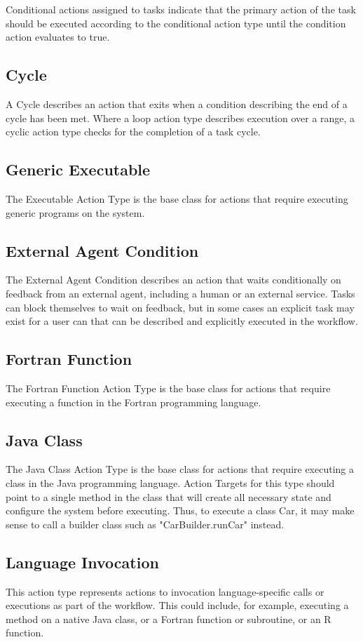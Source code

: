 Conditional actions assigned to tasks indicate that the primary action of the task should be executed according to the conditional action type until the condition action evaluates to true.
			\subsection{
			Cycle
			}
			A Cycle describes an action that exits when a condition describing the end of a cycle has been met. Where a loop action type describes execution over a range, a cyclic action type checks for the completion of a task cycle.
			\subsection{
			Generic Executable
			}
			The Executable Action Type is the base class for actions that require executing generic programs on the system.
			\subsection{
			External Agent Condition
			}
			The External Agent Condition describes an action that waits conditionally on feedback from an external agent, including a human or an external service. Tasks can block themselves to wait on feedback, but in some cases an explicit task may exist for a user can that can be described and explicitly executed in the workflow.
			\subsection{
			Fortran Function
			}
			The Fortran Function Action Type is the base class for actions that require executing a function in the Fortran programming language.
			\subsection{
			Java Class
			}
			The Java Class Action Type is the base class for actions that require executing a class in the Java programming language. Action Targets for this type should point to a single method in the class that will create all necessary state and configure the system before executing. Thus, to execute a class Car, it may make sense to call a builder class such as "CarBuilder.runCar" instead.
			\subsection{
			Language Invocation
			}
			This action type represents actions to invocation language-specific calls or executions as part of the workflow. This could include, for example, executing a method on a native Java class, or a Fortran function or subroutine, or an R function.
